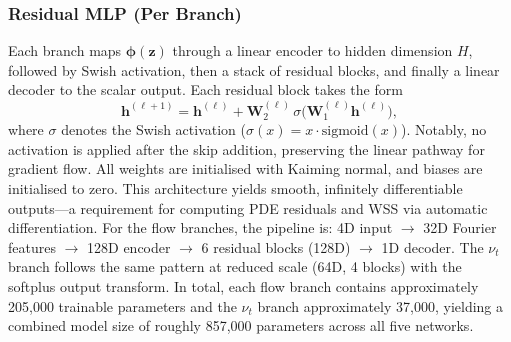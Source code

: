 \documentclass[11pt,a4paper]{article}
\begin{document}
\subsubsection{Residual MLP (Per Branch)}

Each branch maps $\mathbf{\phi}(\mathbf{z})$ through a linear encoder to hidden dimension $H$, followed by Swish activation, then a stack of residual blocks, and finally a linear decoder to the scalar output. Each residual block takes the form
\begin{equation}
\mathbf{h}^{(\ell+1)} = \mathbf{h}^{(\ell)} + \mathbf{W}_2^{(\ell)}\, \sigma\bigl( \mathbf{W}_1^{(\ell)} \mathbf{h}^{(\ell)} \bigr),
\end{equation}
where $\sigma$ denotes the Swish activation ($\sigma(x) = x \cdot \mathrm{sigmoid}(x)$). Notably, no activation is applied after the skip addition, preserving the linear pathway for gradient flow. All weights are initialised with Kaiming normal, and biases are initialised to zero. This architecture yields smooth, infinitely differentiable outputs---a requirement for computing PDE residuals and WSS via automatic differentiation. For the flow branches, the pipeline is: 4D input $\to$ 32D Fourier features $\to$ 128D encoder $\to$ 6 residual blocks (128D) $\to$ 1D decoder. The $\nu_t$ branch follows the same pattern at reduced scale (64D, 4 blocks) with the softplus output transform. In total, each flow branch contains approximately 205{,}000 trainable parameters and the $\nu_t$ branch approximately 37{,}000, yielding a combined model size of roughly 857{,}000 parameters across all five networks.
\end{document}

